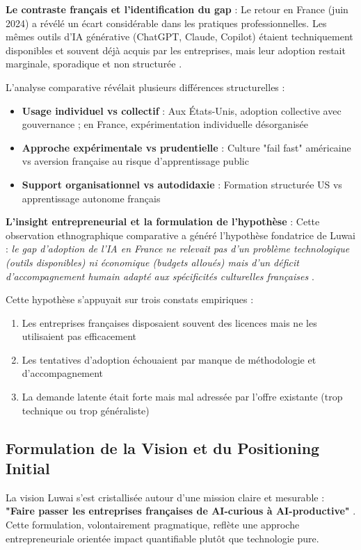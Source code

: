 \textbf{Le contraste français et l'identification du gap} : Le retour en France (juin 2024) a révélé un écart considérable dans les pratiques professionnelles. Les mêmes outils d'IA générative (ChatGPT, Claude, Copilot) étaient techniquement disponibles et souvent déjà acquis par les entreprises, mais leur adoption restait marginale, sporadique et non structurée \cite{bpifrance2024ia_pme}.

L'analyse comparative révélait plusieurs différences structurelles :
\begin{itemize}
    \item \textbf{Usage individuel vs collectif} : Aux États-Unis, adoption collective avec gouvernance ; en France, expérimentation individuelle désorganisée
    \item \textbf{Approche expérimentale vs prudentielle} : Culture "fail fast" américaine vs aversion française au risque d'apprentissage public
    \item \textbf{Support organisationnel vs autodidaxie} : Formation structurée US vs apprentissage autonome français
\end{itemize}

\textbf{L'insight entrepreneurial et la formulation de l'hypothèse} : Cette observation ethnographique comparative a généré l'hypothèse fondatrice de Luwai : \emph{le gap d'adoption de l'IA en France ne relevait pas d'un problème technologique (outils disponibles) ni économique (budgets alloués) mais d'un déficit d'accompagnement humain adapté aux spécificités culturelles françaises} \cite{hofstede2001culture}.

Cette hypothèse s'appuyait sur trois constats empiriques :
\begin{enumerate}
    \item Les entreprises françaises disposaient souvent des licences mais ne les utilisaient pas efficacement
    \item Les tentatives d'adoption échouaient par manque de méthodologie et d'accompagnement
    \item La demande latente était forte mais mal adressée par l'offre existante (trop technique ou trop généraliste)
\end{enumerate}

\subsection{Formulation de la Vision et du Positioning Initial}

La vision Luwai s'est cristallisée autour d'une mission claire et mesurable : \textbf{"Faire passer les entreprises françaises de AI-curious à AI-productive"} \cite{luwai2024vision}. Cette formulation, volontairement pragmatique, reflète une approche entrepreneuriale orientée impact quantifiable plutôt que technologie pure.


